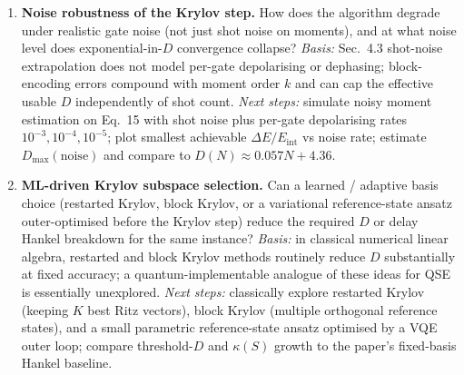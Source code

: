 \begin{enumerate}
  \item \textbf{Noise robustness of the Krylov step.}  How does the algorithm
    degrade under realistic gate noise (not just shot noise on moments), and at
    what noise level does exponential-in-$D$ convergence collapse?  \emph{Basis:}
    Sec.~4.3 shot-noise extrapolation does not model per-gate depolarising or
    dephasing; block-encoding errors compound with moment order $k$ and can cap
    the effective usable $D$ independently of shot count.  \emph{Next steps:}
    simulate noisy moment estimation on Eq.~15 with shot noise plus per-gate
    depolarising rates $10^{-3}, 10^{-4}, 10^{-5}$; plot smallest achievable
    $\Delta E / E_{\mathrm{int}}$ vs noise rate; estimate $D_{\max}(\mathrm{noise})$
    and compare to $D(N) \approx 0.057 N + 4.36$.

  \item \textbf{ML-driven Krylov subspace selection.}  Can a learned / adaptive
    basis choice (restarted Krylov, block Krylov, or a variational reference-state
    ansatz outer-optimised before the Krylov step) reduce the required $D$ or
    delay Hankel breakdown for the same instance?  \emph{Basis:} in classical
    numerical linear algebra, restarted and block Krylov methods routinely
    reduce $D$ substantially at fixed accuracy; a quantum-implementable analogue
    of these ideas for QSE is essentially unexplored.  \emph{Next steps:}
    classically explore restarted Krylov (keeping $K$ best Ritz vectors), block
    Krylov (multiple orthogonal reference states), and a small parametric
    reference-state ansatz optimised by a VQE outer loop; compare threshold-$D$
    and $\kappa(S)$ growth to the paper's fixed-basis Hankel baseline.
\end{enumerate}
